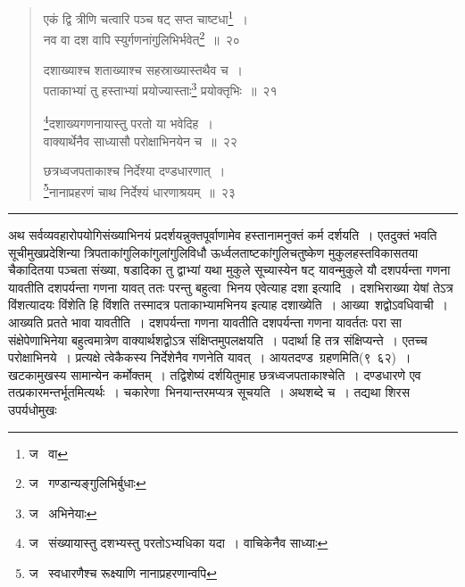 \documentclass[11pt, openany]{book}
\begin{document}
\begin{quote}
{\na एकं द्वि त्रीणि चत्वारि पञ्च षट् सप्त चाष्टधा\renewcommand{\thefootnote}{1}\footnote{ज \textendash\  वा}~।\\
नव वा दश वापि स्युर्गणनांगुलिभिर्भवेत्\renewcommand{\thefootnote}{2}\footnote{ज \textendash\  गण्डान्यङ्गुलिभिर्बुधाः}~॥~२०

दशाख्याश्च शताख्याश्च सहस्राख्यास्तथैव च~।\\
पताकाभ्यां तु हस्ताभ्यां प्रयोज्यास्ताः\renewcommand{\thefootnote}{3}\footnote{ज \textendash\  अभिनेयाः} प्रयोक्तृभिः~॥~२१

\renewcommand{\thefootnote}{4}\footnote{ज \textendash\  संख्यायास्तु दशभ्यस्तु परतोऽभ्यधिका यदा~। वाचिकेनैव साध्याः}दशाख्यगणनायास्तु परतो या भवेदिह~।\\
वाक्यार्थेनैव साध्यासौ परोक्षाभिनयेन च~॥~२२

छत्रध्वजपताकाश्च निर्देश्या दण्डधारणात्~।\\
\renewcommand{\thefootnote}{5}\footnote{ज \textendash\  स्वधारणैश्च रूक्ष्याणि नानाप्रहरणान्वपि}नानाप्रहरणं चाथ निर्देश्यं धारणाश्रयम्~॥~२३}
\end{quote}

\hrule

\vspace{2mm}
अथ सर्वव्यवहारोपयोगिसंख्याभिनयं प्रदर्शयन्नुक्तपूर्वाणामेव हस्तानामनुक्तं कर्म दर्शयति~। एतदुक्तं भवति सूचीमुखप्रदेशिन्या त्रिपताकांगुलिकांगुलांगुलिविधौ ऊर्ध्वलताष्टकांगुलिचतुष्केण मुकुलहस्तविकासतया चैकादितया पञ्चता संख्या, षडादिका तु द्वाभ्यां यथा मुकुले सूच्यास्येन षट् यावन्मुकुले यौ दशपर्यन्ता गणना यावतीति दशपर्यन्ता गणना यावत् ततः परन्तु बहुत्वा\textendash\ भिनय एवेत्याह दशा इत्यादि~। दशभिराख्या येषां तेऽत्र विंशत्यादयः विंशेति हि विंशति तस्मादत्र पताकाभ्यामभिनय इत्याह दशाख्येति~। आख्या\textendash\ शद्वोऽवधिवाची~। आख्यति प्रतते भावा यावतीति~। दशपर्यन्ता गणना यावतीति दशपर्यन्ता गणना यावर्ततः परा सा संक्षेपेणाभिनेया बहुत्वमात्रेण वाक्यार्थशद्वोऽत्र संक्षिप्तमुपलक्षयति~। पदार्था हि तत्र संक्षिप्यन्ते~। एतच्च परोक्षाभिनये~। प्रत्यक्षे त्वेकैकस्य निर्देशेनैव गणनेति यावत्~। आयतदण्ड\textendash\ ग्रहणमिति(९\textendash\ ६२)~। खटकामुखस्य सामान्येन कर्मोक्तम्~। तद्विशेष्यं दर्शयितुमाह छत्रध्वजपताकाश्चेति~। दण्डधारणे एव तत्प्रकारमन्तर्भूतमित्यर्थः~। चकारेणा\textendash\ भिनयान्तरमप्यत्र सूचयति~। अथशब्दे च~। तद्यथा शिरस उपर्यधोमुखः

\newpage
\end{document}
